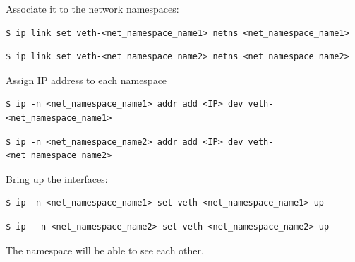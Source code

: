 \documentclass{article}
\newenvironment{codetemplate}[1][]{%
  \mybasecolorbox[#1]
  \itshape
}{%
  \endmybasecolorbox
}
\begin{document}
Associate it to the network namespaces:
\begin{codetemplate}{}
\begin{verbatim}
$ ip link set veth-<net_namespace_name1> netns <net_namespace_name1>
\end{verbatim}
\end{codetemplate}
\begin{codetemplate}{}
\begin{verbatim}
$ ip link set veth-<net_namespace_name2> netns <net_namespace_name2>
\end{verbatim}
\end{codetemplate}

Assign IP address to each namespace
\begin{codetemplate}{}
\begin{verbatim}
$ ip -n <net_namespace_name1> addr add <IP> dev veth-<net_namespace_name1>
\end{verbatim}
\end{codetemplate}
\begin{codetemplate}{}
\begin{verbatim}
$ ip -n <net_namespace_name2> addr add <IP> dev veth-<net_namespace_name2>
\end{verbatim}
\end{codetemplate}

Bring up the interfaces:
\begin{codetemplate}{}
\begin{verbatim}
$ ip -n <net_namespace_name1> set veth-<net_namespace_name1> up
\end{verbatim}
\end{codetemplate}
\begin{codetemplate}{}
\begin{verbatim}
$ ip  -n <net_namespace_name2> set veth-<net_namespace_name2> up
\end{verbatim}
\end{codetemplate}

The namespace will be able to see each other.
\end{document}
